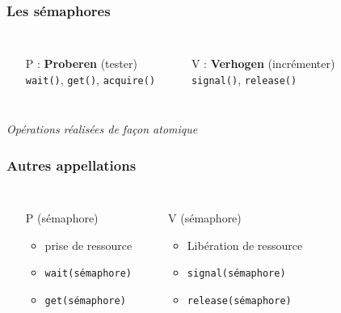 \begin{frame}
\frametitle{Les sémaphores}
\begin{columns}
\begin{itemize}
\item[P] : \textbf{Proberen} (tester)\\ \texttt{wait()}, \texttt{get()}, \texttt{acquire()}
\end{itemize}

\begin{itemize}
\item[V] : \textbf{Verhogen} (incrémenter)\\ \texttt{signal()}, \texttt{release()}
\end{itemize}

\end{columns}
\begin{block}{}
\begin{center}
\textit{Opérations réalisées de façon atomique}
\end{center}
\end{block}
\end{frame}

\begin{frame}
\frametitle{Autres appellations}
\begin{columns}
\begin{itemize}
\item[P] (sémaphore)
\begin{itemize}
\item prise de ressource

\item \texttt{wait(sémaphore)}
\item \texttt{get(sémaphore)}
\end{itemize}
\end{itemize}
\begin{itemize}
\item[V] (sémaphore)
\begin{itemize}
\item Libération de ressource

\item \texttt{signal(sémaphore)}
\item \texttt{release(sémaphore)}
\end{itemize}
\end{itemize}
\end{columns}
\end{frame}

